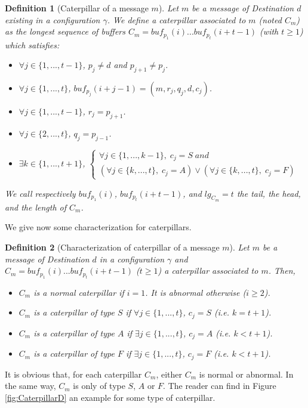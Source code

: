 \documentclass[11pt]{article}
\newtheorem{definition}{Definition}
\begin{document}
\begin{definition} [Caterpillar of a message $m$] 
Let $m$ be a message of Destination $d$ existing in a configuration $\gamma$. We define a caterpillar associated to $m$ (noted $C_{m}$) as the longest sequence of buffers $C_{m}=buf_{p_{1}}(i)...buf_{p_{t}}(i+t-1)$ (with $t \geq 1$) which satisfies:
\begin{itemize}
\item $\forall j\in\{1,...,t-1\}$, $p_{j}\neq d$ and $p_{j+1}\neq p_{j}$.
\item $\forall j\in\{1,...,t\}$, $buf_{p_{j}}(i+j-1)=(m,r_{j},q_{j},d,c_{j})$.
\item $\forall j\in\{1,...,t-1\}$, $r_{j}=p_{j+1}$.
\item $\forall j\in\{2,...,t\}$, $q_{j}=p_{j-1}$.
\item $\exists k\in\{1,...,t+1\}$, $\begin{cases}
\forall j\in\{1,...,k-1\},\; c_{j}=S\; and\\
(\forall j\in\{k,...,t\},\; c_{j}=A)\vee(\forall j\in\{k,...,t\},\; c_{j}=F)\end{cases}$
\end{itemize}
We call respectively $buf_{p_{1}}(i)$, $buf_{p_{t}}(i+t-1)$, and $lg_{C_{m}}=t$ the tail, the head, and the length of $C_{m}$.
\end{definition}

We give now some characterization for caterpillars.

\begin{definition} [Characterization of caterpillar of a message $m$]
Let $m$ be a message of Destination $d$ in a configuration $\gamma$ and $C_{m}=buf_{p_{1}}(i)...buf_{p_{t}}(i+t-1)$ ($t\geq1$) a caterpillar associated to $m$. Then,
\begin{itemize}
\item $C_{m}$ is a normal caterpillar if $i=1$. It is abnormal otherwise ($i\geq2$).
\item $C_{m}$ is a caterpillar of type $S$ if $\forall j\in\{1,...,t\}$, $c_{j}=S$ (\emph{i.e.} $k=t+1$).
\item $C_{m}$ is a caterpillar of type $A$ if $\exists j\in\{1,...,t\}$, $c_{j}=A$ (\emph{i.e.} $k<t+1$).
\item $C_{m}$ is a caterpillar of type $F$ if $\exists j\in\{1,...,t\}$, $c_{j}=F$ (\emph{i.e.} $k<t+1$).
\end{itemize}
\end{definition}

It is obvious that, for each caterpillar $C_{m}$, either $C_{m}$ is normal or abnormal. In the same way, $C_{m}$ is only of type $S$, $A$ or $F$. The reader can find in Figure \ref{fig:CaterpillarD} an example for some type of caterpillar. 
\end{document}
